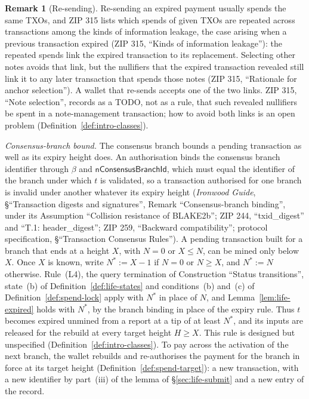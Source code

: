 \documentclass[11pt,a4paper]{article}
\theoremstyle{definition}
\newtheorem{remark}[theorem]{Remark}
\begin{document}
\begin{remark}[Re-sending]
Re-sending an expired payment usually spends the same TXOs, and ZIP 315
lists which spends of given TXOs are repeated across transactions among the
kinds of information leakage, the case arising when a previous transaction
expired (ZIP 315, ``Kinds of information leakage''): the repeated spends
link the expired transaction to its replacement. Selecting other notes
avoids that link, but the nullifiers that the expired transaction revealed
still link it to any later transaction that spends those notes (ZIP 315,
``Rationale for anchor selection''). A wallet that re-sends accepts one of
the two links. ZIP 315, ``Note selection'', records as a TODO, not as a
rule, that such revealed nullifiers be spent in a note-management
transaction; how to avoid both links is an open problem
(Definition~\ref{def:intro-classes}).
\end{remark}

\emph{Consensus-branch bound.} The consensus branch bounds a pending transaction
as well as its expiry height does. An authorisation binds the consensus branch
identifier through $\beta$ and $\mathsf{nConsensusBranchId}$, which must equal
the identifier of the branch under which $t$ is validated, so a transaction
authorised for one branch is invalid under another whatever its expiry height
(\emph{Ironwood Guide}, \S``Transaction digests and signatures'', Remark
``Consensus-branch binding'', under its Assumption ``Collision resistance of
BLAKE2b''; ZIP 244, ``txid\_digest'' and ``T.1: header\_digest''; ZIP 259,
``Backward compatibility''; protocol specification, \S``Transaction Consensus
Rules''). A pending transaction built for a branch that ends at a height $X$,
with $N = 0$ or $X \le N$, can be mined only below $X$. Once $X$ is known, write
$N^{*} := X - 1$ if $N = 0$ or $N \ge X$, and $N^{*} := N$ otherwise. Rule~(L4),
the query termination of Construction ``Status transitions'', state~(b) of
Definition~\ref{def:life-states} and conditions~(b) and~(c) of
Definition~\ref{def:spend-lock} apply with $N^{*}$ in place of $N$, and
Lemma~\ref{lem:life-expired} holds with $N^{*}$, by the branch binding in place
of the expiry rule. Thus $t$ becomes expired unmined from a report at a tip of
at least $N^{*}$, and its inputs are released for the rebuild at every target
height $H \ge X$. This rule is designed but unspecified
(Definition~\ref{def:intro-classes}). To pay across the activation of the next
branch, the wallet rebuilds and re-authorises the payment for the branch in
force at its target height (Definition~\ref{def:spend-target}): a new
transaction, with a new identifier by part~(iii) of the lemma of
\S\ref{sec:life-submit} and a new entry of the record.
\end{document}
